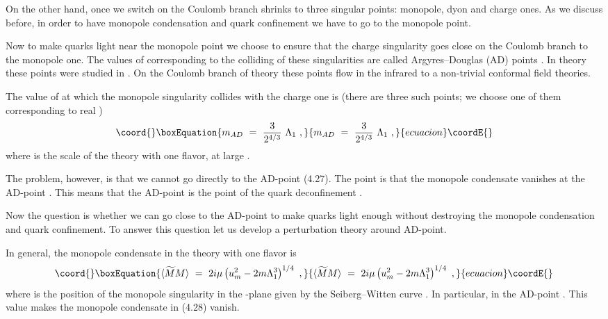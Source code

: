 \documentclass[a4paper,12pt]{article}
\begin{document}
On the other hand, once we switch on \myHighlight{$\mu $}\coordHE{} the Coulomb
branch shrinks to three singular points: monopole, dyon and
charge ones. As we discuss before, in order to have monopole
condensation and quark confinement we have to go to the monopole
point.

Now to make quarks light near the monopole point we  choose  \coordHE{}
to ensure that the charge singularity goes close on the Coulomb
branch to the monopole one. The values of \coordHE{} corresponding to
the colliding of these singularities are called Argyres--Douglas
(AD) points \cite{AD}. In \coordHE{} theory these points were
studied in \cite{APSW}. On the Coulomb branch of \coordHE{} theory
these points flow in the infrared to a non-trivial conformal field
theories.

The value of \coordHE{} at which the monopole singularity collides with the
charge one is \cite{APSW} (there are three such points; we choose
one of them corresponding to real \coordHE{})
\begin{equation}\coord{}\boxEquation{
m_{AD}\ =\ \frac3{2^{4/3}}\ \Lambda_1\ ,
}{
m_{AD}\ =\ \frac3{2^{4/3}}\ \Lambda_1\ ,
}{ecuacion}\coordE{}\end{equation}
where \coordHE{} is the scale of the theory with one flavor,
\coordHE{} at large \coordHE{} .

The problem, however, is that we cannot go directly to the
AD-point (4.27). The point is that the monopole condensate
vanishes at the AD-point \cite{GVY}. This means that the
AD-point is the point of the quark deconfinement \cite{GVY}.

Now the question is whether we can go close to the AD-point to
make quarks light enough without destroying the monopole
condensation and quark confinement. To answer this question let
us develop a perturbation theory around AD-point.

In general, the monopole condensate in the theory with one
flavor is \cite{GVY}
\begin{equation}\coord{}\boxEquation{
\langle\widetilde MM\rangle\ =\
2i\mu \left(u^2_m-2m\Lambda^3_1\right)^{1/4}\ ,
}{
\langle\widetilde MM\rangle\ =\
2i\mu \left(u^2_m-2m\Lambda^3_1\right)^{1/4}\ ,
}{ecuacion}\coordE{}\end{equation}
where \myHighlight{$u_m$}\coordHE{} is the position of the monopole singularity in the
\myHighlight{$u$}\coordHE{}-plane given by the Seiberg--Witten curve \cite{SW2}. In
particular, in the AD-point \myHighlight{$u^{AD}_m=\frac43m^2_{AD}$}\coordHE{}. This
value makes  the monopole condensate in (4.28) vanish.
\end{document}
